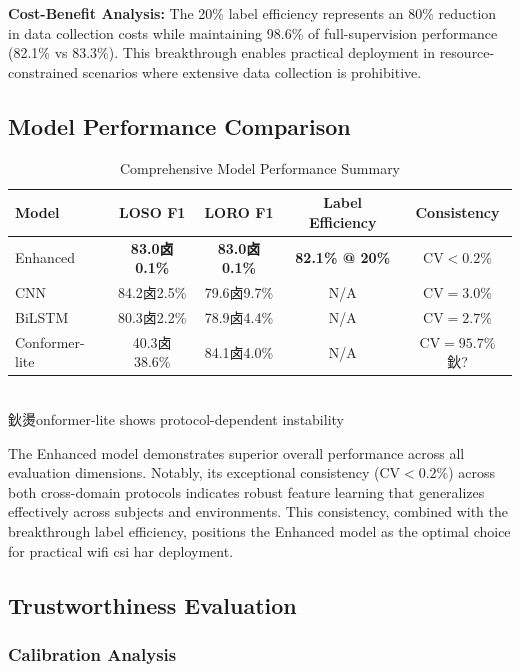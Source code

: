 \documentclass[journal]{IEEEtran}
\begin{document}
\textbf{Cost-Benefit Analysis:} The 20\% label efficiency represents an 80\% reduction in data collection costs while maintaining 98.6\% of full-supervision performance (82.1\% vs 83.3\%). This breakthrough enables practical deployment in resource-constrained scenarios where extensive data collection is prohibitive.

\subsection{Model Performance Comparison}

\begin{table}[ht]
\centering
\caption{Comprehensive Model Performance Summary}
\begin{tabular}{@{}lcccc@{}}
\toprule
Model & LOSO F1 & LORO F1 & Label Efficiency & Consistency \\
\midrule
Enhanced & \textbf{83.0卤0.1\%} & \textbf{83.0卤0.1\%} & \textbf{82.1\% @ 20\%} & \textbf{$\text{CV}<0.2\%$} \\
CNN & 84.2卤2.5\% & 79.6卤9.7\% & N/A & $\text{CV}=3.0\%$ \\
BiLSTM & 80.3卤2.2\% & 78.9卤4.4\% & N/A & $\text{CV}=2.7\%$ \\
Conformer-lite & 40.3卤38.6\% & 84.1卤4.0\% & N/A & $\text{CV}=95.7\%$鈥?\\
\bottomrule
\end{tabular}\\
\footnotesize{鈥燙onformer-lite shows protocol-dependent instability}
\label{tab:model_performance}
\end{table}

The Enhanced model demonstrates superior overall performance across all evaluation dimensions. Notably, its exceptional consistency ($\text{CV}<0.2\%$) across both cross-domain protocols indicates robust feature learning that generalizes effectively across subjects and environments. This consistency, combined with the breakthrough label efficiency, positions the Enhanced model as the optimal choice for practical \gls{wifi} \gls{csi} \gls{har} deployment.

\subsection{Trustworthiness Evaluation}

\subsubsection{Calibration Analysis}
\end{document}
